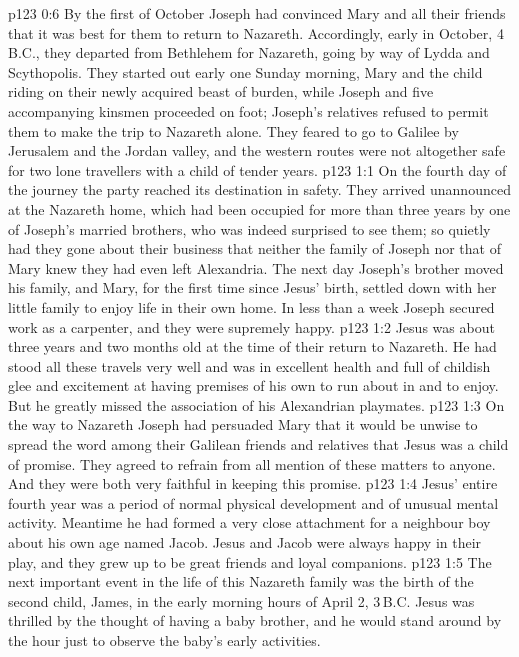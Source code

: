 \vs p123 0:6 By the first of October Joseph had convinced Mary and all their friends that it was best for them to return to Nazareth. Accordingly, early in October, 4\,B.C., they departed from Bethlehem for Nazareth, going by way of Lydda and Scythopolis. They started out early one Sunday morning, Mary and the child riding on their newly acquired beast of burden, while Joseph and five accompanying kinsmen proceeded on foot; Joseph’s relatives refused to permit them to make the trip to Nazareth alone. They feared to go to Galilee by Jerusalem and the Jordan valley, and the western routes were not altogether safe for two lone travellers with a child of tender years.
\vs p123 1:1 On the fourth day of the journey the party reached its destination in safety. They arrived unannounced at the Nazareth home, which had been occupied for more than three years by one of Joseph’s married brothers, who was indeed surprised to see them; so quietly had they gone about their business that neither the family of Joseph nor that of Mary knew they had even left Alexandria. The next day Joseph’s brother moved his family, and Mary, for the first time since Jesus’ birth, settled down with her little family to enjoy life in their own home. In less than a week Joseph secured work as a carpenter, and they were supremely happy.
\vs p123 1:2 Jesus was about three years and two months old at the time of their return to Nazareth. He had stood all these travels very well and was in excellent health and full of childish glee and excitement at having premises of his own to run about in and to enjoy. But he greatly missed the association of his Alexandrian playmates.
\vs p123 1:3 On the way to Nazareth Joseph had persuaded Mary that it would be unwise to spread the word among their Galilean friends and relatives that Jesus was a child of promise. They agreed to refrain from all mention of these matters to anyone. And they were both very faithful in keeping this promise.
\vs p123 1:4 Jesus’ entire fourth year was a period of normal physical development and of unusual mental activity. Meantime he had formed a very close attachment for a neighbour boy about his own age named Jacob. Jesus and Jacob were always happy in their play, and they grew up to be great friends and loyal companions.
\vs p123 1:5 The next important event in the life of this Nazareth family was the birth of the second child, James, in the early morning hours of April 2, 3\,B.C. Jesus was thrilled by the thought of having a baby brother, and he would stand around by the hour just to observe the baby’s early activities.
